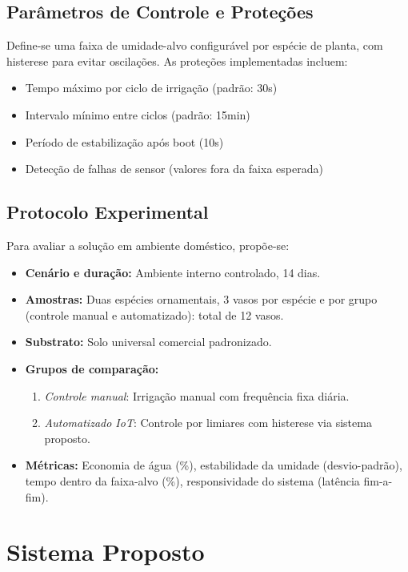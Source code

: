 \documentclass[twoside,english,brazilian]{UNISINOSmonografia}
\begin{document}
\section{Parâmetros de Controle e Proteções}
Define-se uma faixa de umidade-alvo configurável por espécie de planta, com histerese para evitar oscilações. As proteções implementadas incluem:
\begin{itemize}
    \item Tempo máximo por ciclo de irrigação (padrão: 30s)
    \item Intervalo mínimo entre ciclos (padrão: 15min)
    \item Período de estabilização após boot (10s)
    \item Detecção de falhas de sensor (valores fora da faixa esperada)
\end{itemize}

\section{Protocolo Experimental}
Para avaliar a solução em ambiente doméstico, propõe-se:
\begin{itemize}
    \item \textbf{Cenário e duração:} Ambiente interno controlado, 14 dias.
    \item \textbf{Amostras:} Duas espécies ornamentais, 3 vasos por espécie e por grupo (controle manual e automatizado): total de 12 vasos.
    \item \textbf{Substrato:} Solo universal comercial padronizado.
    \item \textbf{Grupos de comparação:} 
        \begin{enumerate}
            \item \emph{Controle manual}: Irrigação manual com frequência fixa diária.
            \item \emph{Automatizado IoT}: Controle por limiares com histerese via sistema proposto.
        \end{enumerate}
    \item \textbf{Métricas:} Economia de água (\%), estabilidade da umidade (desvio-padrão), tempo dentro da faixa-alvo (\%), responsividade do sistema (latência fim-a-fim).
\end{itemize}

\chapter{Sistema Proposto}
\end{document}
